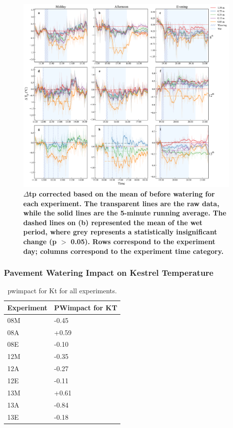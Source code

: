 \documentclass[final,3p,times,authoryear]{elsarticle}
\begin{document}
\begin{figure}
\centering
\includegraphics[trim={0 0 0 0},clip,scale=1.0]{pict043.png}
\caption{\bf $\Delta$\gls{tp} corrected based on the mean of before watering for each experiment. The transparent lines are the raw data, while the solid lines are the 5-minute running average. The dashed lines on (b) represented the mean of the wet period, where grey represents a statistically insignificant change (\gls{p} $>$ 0.05). Rows correspond to the experiment day; columns correspond to the experiment time category.}
 \label{fig:7.14}
\end{figure}
\clearpage


\subsubsection{Pavement Watering Impact on Kestrel Temperature}\label{sec:appendix7.5.7}

\begin{table}[!ht]\caption{\gls{pwimpact} for \gls{Kt} for all experiments.}
    \centering
    \begin{tabular}{|l|l|}
    \hline
        Experiment & PWimpact for KT \\ \hline
        08M & -0.45 \\ \hline
        08A & +0.59 \\ \hline
        08E & -0.10 \\ \hline
        12M & -0.35 \\ \hline
        12A & -0.27 \\ \hline
        12E & -0.11 \\ \hline
        13M & +0.61 \\ \hline
        13A & -0.84 \\ \hline
        13E & -0.18 \\ \hline
    \end{tabular}\label{table:7.4}
\end{table}
\clearpage
\end{document}
